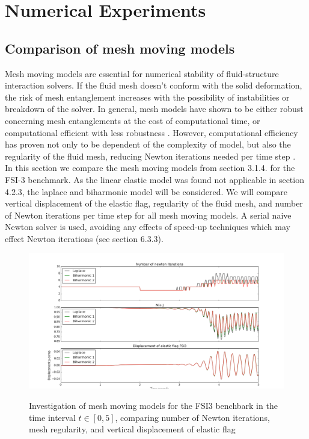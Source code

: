  \chapter{Numerical Experiments}

\section{Comparison of mesh moving models}
Mesh moving models are essential for numerical stability of fluid-structure interaction solvers. If the fluid mesh doesn't conform with the solid deformation, the risk of mesh entanglement increases with the possibility of instabilities or breakdown of the solver. In general, mesh models have shown to be either robust concerning mesh entanglements at the cost of computational time, or computational efficient with less robustness \cite{MM2016}. However, computational efficiency has proven not only to be dependent of the complexity of model, but also the regularity of the fluid mesh, reducing Newton iterations needed per time step \cite{Wickb}. \\ In this section we compare the mesh moving models from section 3.1.4. for the FSI-3 benchmark. As the linear elastic model was found not applicable in section 4.2.3, the laplace and biharmonic model will be considered. 
We will compare vertical displacement of the elastic flag, regularity of the fluid mesh, and number of Newton iterations per time step for all mesh moving models. A serial naive Newton solver is used, avoiding any effects of speed-up techniques which may effect Newton iterations (see section 6.3.3). 

\newpage
\begin{figure}[h!]
 	\centering
    \includegraphics[scale=0.4]{./Fig/minjcompare.png} \\
      \caption{Investigation of mesh moving models for the FSI3 benchbark in the time interval $t \in [0, 5]$, comparing number of Newton iterations, mesh regularity, and vertical displacement of elastic flag }
      \label{fig:minjcomp}
\end{figure}

